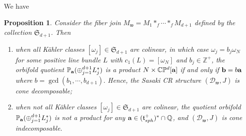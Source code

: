 \documentclass[12pt]{amsart}
\newtheorem{proposition}[theorem]{Proposition}
\def\bbc{{\mathbb C}}
\def\bbp{{\mathbb P}}
\def\bbq{{\mathbb Q}}
\def\bbz{{\mathbb Z}}
\def\gro{\omega}
\def\bfa{{\bf a}}
\def\bfb{{\bf b}}
\def\cald{{\mathcal D}}
\def\gt{{\mathfrak t}}
\def\gw{{\mathfrak w}}
\def\gS{{\mathfrak S}}
\begin{document}
We have

\begin{proposition}\label{projprod}
Consider the fiber join $M_\gw=M_1*_f\cdots *_fM_{d+1}$ defined by the collection $\gS_{d+1}$. Then 
\begin{enumerate}
\item when all K\"ahler classes $[\gro_j]\in\gS_{d+1}$ are colinear, in which case $\gro_j=b_j\gro_N$ for some positive line bundle $L$ with $c_1(L)=[\gro_N]$ and $b_j\in\bbz^+$, the orbifold quotient $\bbp_\bfa(\oplus_{j=1}^{d+1}L^*_j)$ is a product $N\times \bbc\bbp^d[\bfa]$ if and only if $\bfb=b\bfa$  where $b=\gcd(b_1,\cdots,b_{d+1}).$ Hence, the Sasaki CR structure $(\cald_\gw,J)$ is cone decomposable;
\item when not all K\"ahler classes $[\gro_j]\in\gS_{d+1}$ are colinear, the quotient orbifold $\bbp_\bfa(\oplus_{j=1}^{d+1}L^*_j)$ is not a product for any $\bfa\in (\gt^+_{sph})^*\cap\bbq$, and $(\cald_\gw,J)$ is cone indecomposable.
\end{enumerate}
\end{proposition}
\end{document}
